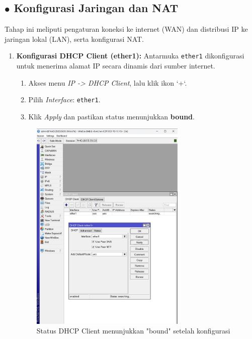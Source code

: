 \subsection*{$\bullet$ Konfigurasi Jaringan dan NAT}
Tahap ini meliputi pengaturan koneksi ke internet (WAN) dan distribusi IP ke jaringan lokal (LAN), serta konfigurasi NAT.

\begin{enumerate}
    \item \textbf{Konfigurasi DHCP Client (ether1):} Antarmuka \texttt{ether1} dikonfigurasi untuk menerima alamat IP secara dinamis dari sumber internet.
    \begin{enumerate}
        \item Akses menu \textit{IP -> DHCP Client}, lalu klik ikon `+`.
        \item Pilih \textit{Interface}: \texttt{ether1}.
        \item Klik \textit{Apply} dan pastikan status menunjukkan \textbf{bound}.
    \end{enumerate}
    \begin{figure}[H]
        \centering
        \includegraphics[width=0.7\textwidth]{img4/DHCPCLient.jpeg}
        \caption{Status DHCP Client menunjukkan "bound" setelah konfigurasi}
    \end{figure}
    

\end{enumerate}
